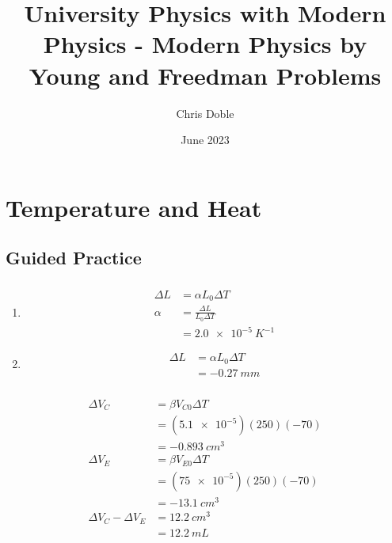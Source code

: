 \documentclass{article}
\title{University Physics with Modern Physics - Modern Physics by Young and Freedman Problems}
\author{Chris Doble}
\date{June 2023}
\begin{document}
\maketitle

\tableofcontents

\setcounter{section}{16}
\section{Temperature and Heat}

\subsection{Guided Practice}

\subsubsection{}

\begin{enumerate}
  \item

        \begin{align*}
          \Delta L & = \alpha L_0 \Delta T           \\
          \alpha   & = \frac{\Delta L}{L_0 \Delta T} \\
                   & = \qty{2.0e-5}{K^{-1}}
        \end{align*}

  \item

        \begin{align*}
          \Delta L & = \alpha L_0 \Delta T \\
                   & = \qty{-0.27}{mm}
        \end{align*}
\end{enumerate}

\subsubsection{}

\begin{align*}
  \Delta V_C              & = \beta V_{C0} \Delta T      \\
                          & = (\num{5.1e-5}) (250) (-70) \\
                          & = -\qty{0.893}{cm^3}         \\
  \Delta V_E              & = \beta V_{E0} \Delta T      \\
                          & = (\qty{75e-5}) (250) (-70)  \\
                          & = -\qty{13.1}{cm^3}          \\
  \Delta V_C - \Delta V_E & = \qty{12.2}{cm^3}           \\
                          & = \qty{12.2}{mL}
\end{align*}
\end{document}
